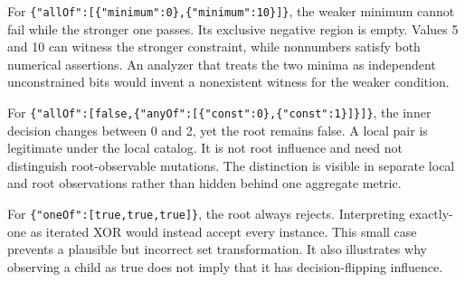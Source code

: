 \documentclass[sigconf,nonacm]{acmart}
\begin{document}
For \texttt{\{\allowbreak{}"\allowbreak{}a\allowbreak{}l\allowbreak{}l\allowbreak{}O\allowbreak{}f\allowbreak{}"\allowbreak{}:\allowbreak{}[\allowbreak{}\{\allowbreak{}"\allowbreak{}m\allowbreak{}i\allowbreak{}n\allowbreak{}i\allowbreak{}m\allowbreak{}u\allowbreak{}m\allowbreak{}"\allowbreak{}:\allowbreak{}0\allowbreak{}\}\allowbreak{},\allowbreak{}\{\allowbreak{}"\allowbreak{}m\allowbreak{}i\allowbreak{}n\allowbreak{}i\allowbreak{}m\allowbreak{}u\allowbreak{}m\allowbreak{}"\allowbreak{}:\allowbreak{}1\allowbreak{}0\allowbreak{}\}\allowbreak{}]\allowbreak{}\}}, the weaker minimum cannot fail while the stronger one passes. Its exclusive negative region is empty. Values 5 and 10 can witness the stronger constraint, while nonnumbers satisfy both numerical assertions. An analyzer that treats the two minima as independent unconstrained bits would invent a nonexistent witness for the weaker condition.

For \texttt{\{\allowbreak{}"\allowbreak{}a\allowbreak{}l\allowbreak{}l\allowbreak{}O\allowbreak{}f\allowbreak{}"\allowbreak{}:\allowbreak{}[\allowbreak{}f\allowbreak{}a\allowbreak{}l\allowbreak{}s\allowbreak{}e\allowbreak{},\allowbreak{}\{\allowbreak{}"\allowbreak{}a\allowbreak{}n\allowbreak{}y\allowbreak{}O\allowbreak{}f\allowbreak{}"\allowbreak{}:\allowbreak{}[\allowbreak{}\{\allowbreak{}"\allowbreak{}c\allowbreak{}o\allowbreak{}n\allowbreak{}s\allowbreak{}t\allowbreak{}"\allowbreak{}:\allowbreak{}0\allowbreak{}\}\allowbreak{},\allowbreak{}\{\allowbreak{}"\allowbreak{}c\allowbreak{}o\allowbreak{}n\allowbreak{}s\allowbreak{}t\allowbreak{}"\allowbreak{}:\allowbreak{}1\allowbreak{}\}\allowbreak{}]\allowbreak{}\}\allowbreak{}]\allowbreak{}\}}, the inner decision changes between 0 and 2, yet the root remains false. A local pair is legitimate under the local catalog. It is not root influence and need not distinguish root-observable mutations. The distinction is visible in separate local and root observations rather than hidden behind one aggregate metric.

For \texttt{\{\allowbreak{}"\allowbreak{}o\allowbreak{}n\allowbreak{}e\allowbreak{}O\allowbreak{}f\allowbreak{}"\allowbreak{}:\allowbreak{}[\allowbreak{}t\allowbreak{}r\allowbreak{}u\allowbreak{}e\allowbreak{},\allowbreak{}t\allowbreak{}r\allowbreak{}u\allowbreak{}e\allowbreak{},\allowbreak{}t\allowbreak{}r\allowbreak{}u\allowbreak{}e\allowbreak{}]\allowbreak{}\}}, the root always rejects. Interpreting exactly-one as iterated XOR would instead accept every instance. This small case prevents a plausible but incorrect set transformation. It also illustrates why observing a child as true does not imply that it has decision-flipping influence.
\end{document}
